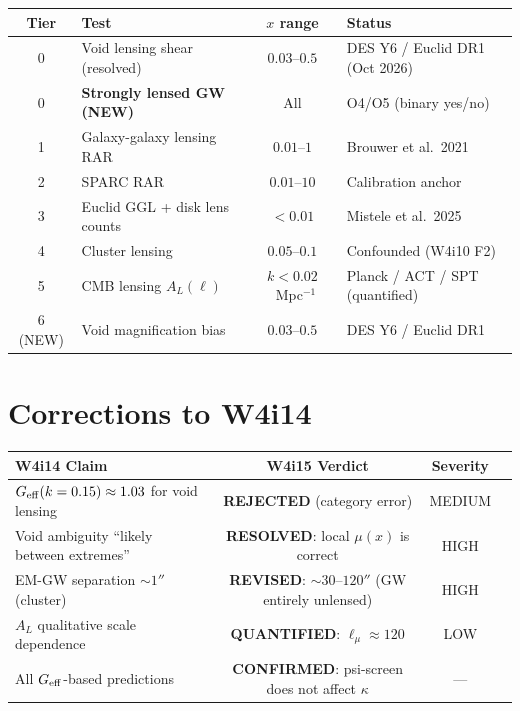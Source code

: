 \documentclass[11pt,a4paper]{article}
\newcommand{\Geff}{G_{\rm eff}}
\begin{document}
\begin{center}
\begin{tabular}{clcl}
\toprule
Tier & Test & $x$ range & Status \\
\midrule
0 & Void lensing shear (resolved) & $0.03$--$0.5$ &
  DES Y6 / Euclid DR1 (Oct 2026) \\
0 & \textbf{Strongly lensed GW (NEW)} & All & O4/O5 (binary yes/no) \\
1 & Galaxy-galaxy lensing RAR & $0.01$--$1$ & Brouwer et al.\ 2021 \\
2 & SPARC RAR & $0.01$--$10$ & Calibration anchor \\
3 & Euclid GGL + disk lens counts & $< 0.01$ & Mistele et al.\ 2025 \\
4 & Cluster lensing & $0.05$--$0.1$ & Confounded (W4i10 F2) \\
5 & CMB lensing $A_L(\ell)$ & $k < 0.02$~Mpc$^{-1}$ &
  Planck / ACT / SPT (quantified) \\
6 (NEW) & Void magnification bias & $0.03$--$0.5$ &
  DES Y6 / Euclid DR1 \\
\bottomrule
\end{tabular}
\end{center}


\section*{Corrections to W4i14}

\begin{center}
\begin{tabular}{lccc}
\toprule
W4i14 Claim & W4i15 Verdict & Severity \\
\midrule
$\Geff(k=0.15) \approx 1.03$ for void lensing &
  \textbf{REJECTED} (category error) & MEDIUM \\
Void ambiguity ``likely between extremes'' &
  \textbf{RESOLVED}: local $\mu(x)$ is correct & HIGH \\
EM-GW separation $\sim 1''$ (cluster) &
  \textbf{REVISED}: $\sim 30$--$120''$ (GW entirely unlensed) & HIGH \\
$A_L$ qualitative scale dependence &
  \textbf{QUANTIFIED}: $\ell_\mu \approx 120$ & LOW \\
All $\Geff$-based predictions &
  \textbf{CONFIRMED}: psi-screen does not affect $\kappa$ & --- \\
\bottomrule
\end{tabular}
\end{center}
\end{document}
